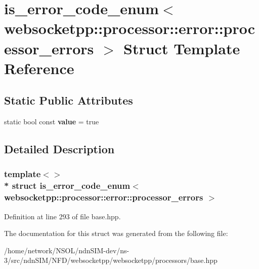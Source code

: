 \hypertarget{structis__error__code__enum_3_01websocketpp_1_1processor_1_1error_1_1processor__errors_01_4}{}\section{is\+\_\+error\+\_\+code\+\_\+enum$<$ websocketpp\+:\+:processor\+:\+:error\+:\+:processor\+\_\+errors $>$ Struct Template Reference}
\label{structis__error__code__enum_3_01websocketpp_1_1processor_1_1error_1_1processor__errors_01_4}
\subsection*{Static Public Attributes}
\begin{DoxyCompactItemize}
\item 
static bool const {\bfseries value} = true\hypertarget{structis__error__code__enum_3_01websocketpp_1_1processor_1_1error_1_1processor__errors_01_4_a981549f083d0fb7c2c7afa8184e59056}{}\label{structis__error__code__enum_3_01websocketpp_1_1processor_1_1error_1_1processor__errors_01_4_a981549f083d0fb7c2c7afa8184e59056}

\end{DoxyCompactItemize}


\subsection{Detailed Description}
\subsubsection*{template$<$$>$\\*
struct is\+\_\+error\+\_\+code\+\_\+enum$<$ websocketpp\+::processor\+::error\+::processor\+\_\+errors $>$}



Definition at line 293 of file base.\+hpp.



The documentation for this struct was generated from the following file\+:\begin{DoxyCompactItemize}
\item 
/home/network/\+N\+S\+O\+L/ndn\+S\+I\+M-\/dev/ns-\/3/src/ndn\+S\+I\+M/\+N\+F\+D/websocketpp/websocketpp/processors/base.\+hpp\end{DoxyCompactItemize}
